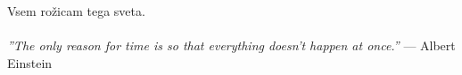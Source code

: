 \thispagestyle{empty}\mbox{}{\textheight}\mbox{}\hfill\begin{minipage}{0.55\textwidth}%

Vsem rožicam tega sveta.\\\\
\textit{''The only reason for time is so that everything doesn't happen at once.''}
\flushright --- Albert Einstein
\normalfont\end{minipage}